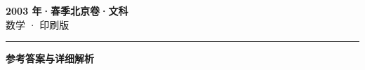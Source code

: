 \documentclass[zihao=5, a4paper]{ctexart}
\begin{document}
\begin{center}
  {\Large\bfseries 2003 年·春季北京卷·文科}\\[4pt]
  {\large 数学 · 印刷版}
\end{center}
\medskip
{}

\par\bigskip\hrule\bigskip
{}
\begin{center}{\large\bfseries 参考答案与详细解析}\end{center}
\smallskip

\end{document}

